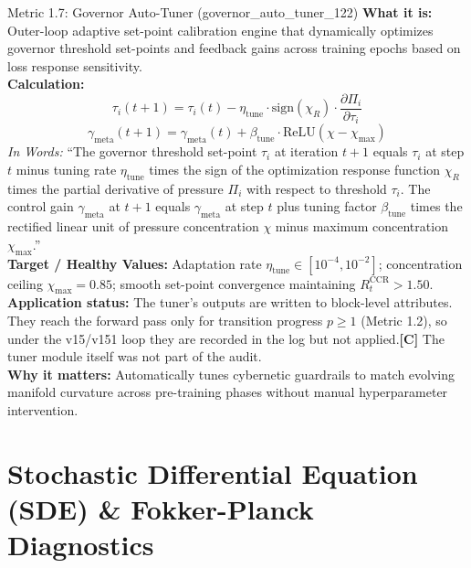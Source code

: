 \documentclass[11pt,a4paper]{article}
\newcommand{\sC}{\textbf{[C]}}
\begin{document}
\begin{metricbox}{Metric 1.7: Governor Auto-Tuner (governor\_auto\_tuner\_122)}
\textbf{What it is:} Outer-loop adaptive set-point calibration engine that dynamically optimizes governor threshold set-points and feedback gains across training epochs based on loss response sensitivity.\\
\textbf{Calculation:}
 $$\tau_i(t+1) = \tau_i(t) - \eta_{\text{tune}} \cdot \text{sign}(\chi_R) \cdot \frac{\partial \Pi_i}{\partial \tau_i}$$  $$\gamma_{\text{meta}}(t+1) = \gamma_{\text{meta}}(t) + \beta_{\text{tune}} \cdot \text{ReLU}\left(\chi - \chi_{\text{max}}\right)$$ \emph{In Words:} ``The governor threshold set-point $\tau_i$ at iteration $t+1$ equals $\tau_i$ at step $t$ minus tuning rate $\eta_{\text{tune}}$ times the sign of the optimization response function $\chi_R$ times the partial derivative of pressure $\Pi_i$ with respect to threshold $\tau_i$. The control gain $\gamma_{\text{meta}}$ at $t+1$ equals $\gamma_{\text{meta}}$ at step $t$ plus tuning factor $\beta_{\text{tune}}$ times the rectified linear unit of pressure concentration $\chi$ minus maximum concentration $\chi_{\text{max}}$.''\\
\textbf{Target / Healthy Values:} Adaptation rate $\eta_{\text{tune}} \in [10^{-4}, 10^{-2}]$; concentration ceiling $\chi_{\text{max}} = 0.85$; smooth set-point convergence maintaining $R_t^{\text{CCR}} > 1.50$.\\
\textbf{Application status:} The tuner's outputs are written to block-level attributes. They reach the forward pass only for transition progress $p \ge 1$ (Metric 1.2), so under the v15/v151 loop they are recorded in the log but not applied.\sC{} The tuner module itself was not part of the audit.\\
\textbf{Why it matters:} Automatically tunes cybernetic guardrails to match evolving manifold curvature across pre-training phases without manual hyperparameter intervention.
\end{metricbox}

\section{Stochastic Differential Equation (SDE) \& Fokker-Planck Diagnostics}
\end{document}

